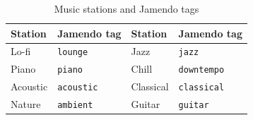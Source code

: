 \begingroup
\small
\renewcommand{\arraystretch}{1.2}
\begin{longtable}{|p{3.4cm}|p{3.4cm}|p{3.4cm}|p{3.4cm}|}
\caption{Music stations and Jamendo tags}\label{tab:stations}\\ \hline
\textbf{Station} & \textbf{Jamendo tag} & \textbf{Station} & \textbf{Jamendo tag} \\ \hline
\endfirsthead
\hline
\endhead
Lo-fi & \texttt{lounge} & Jazz & \texttt{jazz} \\ \hline
Piano & \texttt{piano} & Chill & \texttt{downtempo} \\ \hline
Acoustic & \texttt{acoustic} & Classical & \texttt{classical} \\ \hline
Nature & \texttt{ambient} & Guitar & \texttt{guitar} \\ \hline
\end{longtable}
\endgroup
